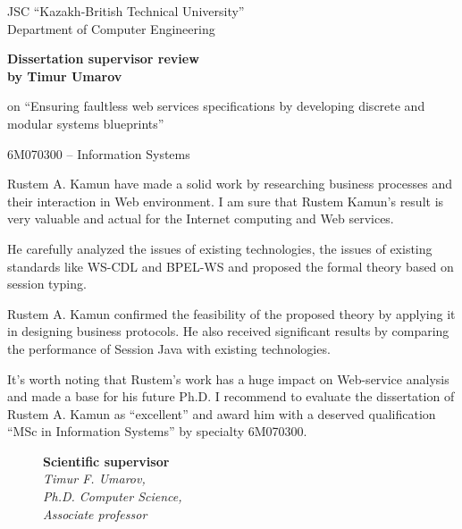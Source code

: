 \begin{titlepage}
\begin{centering}
{        \vspace{14pt}

        JSC ``Kazakh-British Technical University''\\
        Department of Computer Engineering}
       \vspace{14pt}

        {\bf
        Dissertation supervisor review\\
        by Timur Umarov
        }
        
        on ``Ensuring faultless web services specifications by developing discrete and modular systems blueprints''

        \vspace{14pt}
        \small 6M070300 -- Information Systems

    \end{centering}
    
    
    
 Rustem A. Kamun have made a solid work by researching business processes and their interaction in Web environment. I am sure that Rustem Kamun’s result is very valuable and actual for the Internet computing and Web services.
    
He carefully analyzed the issues of existing technologies, the issues of existing standards like WS-CDL and BPEL-WS and proposed the formal theory based on session typing.
    
Rustem A. Kamun confirmed the feasibility of the proposed theory by applying it in designing business protocols. He also received significant results by comparing the performance of Session Java with existing technologies.
     
It’s worth noting that Rustem's work has a huge impact on Web-service analysis and made a base for his future Ph.D.
I recommend to evaluate the dissertation of Rustem A. Kamun as ``excellent'' and award him with a deserved qualification ``MSc in Information Systems'' by specialty 6M070300.
    

         \begin{figure}[ht]
            \begin{minipage}[t]{0.6\linewidth}
                {\bf Scientific supervisor}\\

                {\em Timur F. Umarov,\\
                Ph.D. Computer Science,\\
                Associate professor}\\
                

\end{minipage}
\end{figure}
\end{titlepage}
